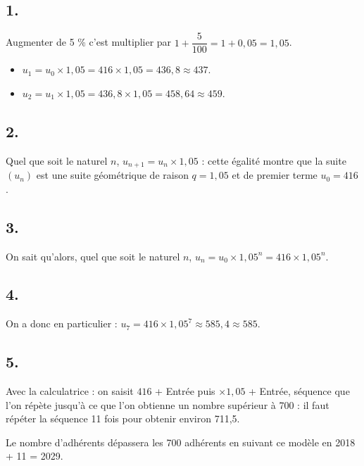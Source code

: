 \subsection*{1.}

Augmenter de 5 \% c'est multiplier par \(1 + \dfrac{5}{100} = 1 + 0{,}05 = 1{,}05\).

\begin{itemize}
    \item \(u_1 = u_0 \times 1{,}05 = 416 \times 1{,}05 = 436{,}8 \approx 437\).
    \item \(u_2 = u_1 \times 1{,}05 = 436{,}8 \times 1{,}05 = 458{,}64 \approx 459\).
\end{itemize}

\subsection*{2.}

Quel que soit le naturel \(n\), \(u_{n+1} = u_n \times 1{,}05\) : cette égalité montre que la suite \((u_n)\) est une suite géométrique de raison \(q = 1{,}05\) et de premier terme \(u_0 = 416\).

\subsection*{3.}

On sait qu'alors, quel que soit le naturel \(n\), \(u_n = u_0 \times 1{,}05^n = 416 \times 1{,}05^n\).

\subsection*{4.}

On a donc en particulier : \(u_7 = 416 \times 1{,}05^7 \approx 585{,}4 \approx 585\).

\subsection*{5.}

Avec la calculatrice : on saisit \(416\) + Entrée puis \(\times 1{,}05\) + Entrée, séquence que l'on répète jusqu'à ce que l'on obtienne un nombre supérieur à 700 : il faut répéter la séquence 11 fois pour obtenir environ 711{,}5.

Le nombre d'adhérents dépassera les 700 adhérents en suivant ce modèle en 2018 + 11 = 2029.
